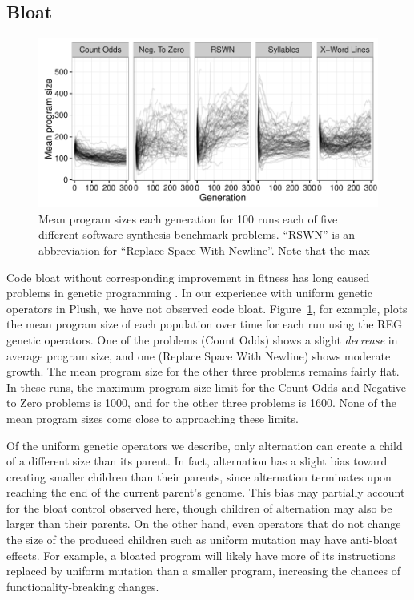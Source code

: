 \documentclass[graybox]{svmult}
\begin{document}
\subsection{Bloat}

\begin{figure}[tb]
\includegraphics[width=\textwidth]{program_sizes_3x6_relabelled}
\caption{Mean program sizes each generation for 100 runs each of five different software synthesis benchmark problems. ``RSWN'' is an abbreviation for ``Replace Space With Newline''. Note that the max}
\label{fig:programSizes}
\end{figure}

Code bloat without corresponding improvement in fitness has long caused problems in genetic programming \cite{Silva:2009:GPEM, luke:dissertation}. In our experience with uniform genetic operators in Plush, we have not observed code bloat.
Figure~\ref{fig:programSizes}, for example, plots the mean program size of each population over time for each run using the REG genetic operators.
One of the problems (Count Odds) shows a slight \emph{decrease} in average program size, and one (Replace Space With Newline) shows moderate growth. The mean program size for the other three problems remains fairly flat. In these runs, the maximum program size limit for the Count Odds and Negative to Zero problems is 1000, and for the other three problems is 1600. None of the mean program sizes come close to approaching these limits.

Of the uniform genetic operators we describe, only alternation can create a child of a different size than its parent. In fact, alternation has a slight bias toward creating smaller children than their parents, since alternation terminates upon reaching the end of the current parent's genome. This bias may partially account for the bloat control observed here, though children of alternation may also be larger than their parents. On the other hand, even operators that do not change the size of the produced children such as uniform mutation may have anti-bloat effects. For example, a bloated program will likely have more of its instructions replaced by uniform mutation than a smaller program, increasing the chances of functionality-breaking changes.
\end{document}
